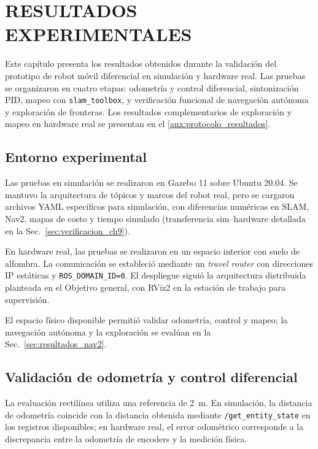 \chapter{RESULTADOS EXPERIMENTALES}
\label{ch:resultados}

Este capítulo presenta los resultados obtenidos durante la validación del prototipo de robot móvil diferencial en simulación y hardware real. Las pruebas se organizaron en cuatro etapas: odometría y control diferencial, sintonización PID, mapeo con \texttt{slam\_toolbox}, y verificación funcional de navegación autónoma y exploración de fronteras. Los resultados complementarios de exploración y mapeo en hardware real se presentan en el \ref{anx:protocolo_resultados}.

\section{Entorno experimental}
\label{sec:entorno_experimental}

Las pruebas en simulación se realizaron en Gazebo 11 sobre Ubuntu 20.04. Se mantuvo la arquitectura de tópicos y marcos del robot real, pero se cargaron archivos YAML específicos para simulación, con diferencias numéricas en SLAM, Nav2, mapas de costo y tiempo simulado (transferencia sim--hardware detallada en la Sec.~\ref{sec:verificacion_ch9}).

En hardware real, las pruebas se realizaron en un espacio interior con suelo de alfombra. La comunicación se estableció mediante un \textit{travel router} con direcciones IP estáticas y \texttt{ROS\_DOMAIN\_ID=0}. El despliegue siguió la arquitectura distribuida planteada en el Objetivo general, con RViz2 en la estación de trabajo para supervisión.

El espacio físico disponible permitió validar odometría, control y mapeo; la navegación autónoma y la exploración se evalúan en la Sec.~\ref{sec:resultados_nav2}.

\section{Validación de odometría y control diferencial}
\label{sec:resultados_odometria}

La evaluación rectilínea utiliza una referencia de 2~m. En simulación, la distancia de odometría coincide con la distancia obtenida mediante \texttt{/get\_entity\_state} en los registros disponibles; en hardware real, el error odométrico corresponde a la discrepancia entre la odometría de encoders y la medición física.

